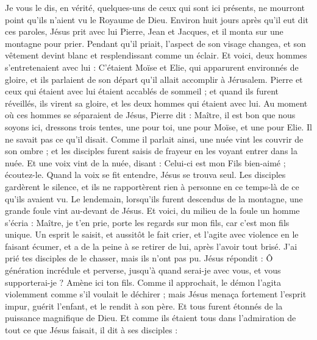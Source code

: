 \begin{multicols}{2}
Je vous le dis, en vérité, quelques-uns de ceux qui sont ici présents, ne mourront point qu’ils n’aient vu le Royaume de Dieu.
Environ huit jours après qu’il eut dit ces paroles, Jésus prit avec lui Pierre, Jean et Jacques, et il monta sur une montagne pour prier.
Pendant qu’il priait, l’aspect de son visage changea, et son vêtement devint blanc et resplendissant comme un éclair.
Et voici, deux hommes s’entretenaient avec lui : C’étaient Moïse et Elie,
qui apparurent environnés de gloire, et ils parlaient de son départ qu'il allait accomplir à Jérusalem.
Pierre et ceux qui étaient avec lui étaient accablés de sommeil ; et quand ils furent réveillés, ils virent sa gloire, et les deux hommes qui étaient avec lui.
Au moment où ces hommes se séparaient de Jésus, Pierre dit : Maître, il est bon que nous soyons ici, dressons trois tentes, une pour toi, une pour Moïse, et une pour Elie. Il ne savait pas ce qu'il disait.
Comme il parlait ainsi, une nuée vint les couvrir de son ombre ; et les disciples furent saisis de frayeur en les voyant entrer dans la nuée.
Et une voix vint de la nuée, disant : Celui-ci est mon Fils bien-aimé ; écoutez-le.
Quand la voix se fit entendre, Jésus se trouva seul. Les disciples gardèrent le silence, et ils ne rapportèrent rien à personne en ce temps-là de ce qu'ils avaient vu.
Le lendemain, lorsqu’ils furent descendus de la montagne, une grande foule vint au-devant de Jésus.
Et voici, du milieu de la foule un homme s'écria : Maître, je t’en prie, porte les regards sur mon fils, car c’est mon fils unique.
Un esprit le saisit, et aussitôt le fait crier, et l'agite avec violence en le faisant écumer, et a de la peine à se retirer de lui, après l'avoir tout brisé.
J’ai prié tes disciples de le chasser, mais ils n'ont pas pu.
Jésus répondit : Ô génération incrédule et perverse, jusqu’à quand serai-je avec vous, et vous supporterai-je ? Amène ici ton fils.
Comme il approchait, le démon l'agita violemment comme s'il voulait le déchirer ; mais Jésus menaça fortement l'esprit impur, guérit l'enfant, et le rendit à son père.
Et tous furent étonnés de la puissance magnifique de Dieu. Et comme ils étaient tous dans l’admiration de tout ce que Jésus faisait, il dit à ses disciples :

\end{multicols}
